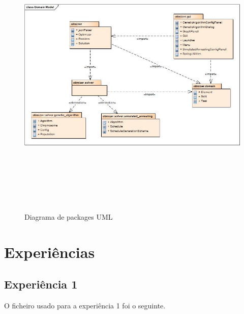 \begin{titlepage}
\begin{figure}[H]
  \centering
    \includegraphics[width=18cm, height = 14cm]{packageDiagram.jpg}
  \caption{Diagrama de packages UML}
  \label{packageD}
\end{figure}

\section{Experiências}

\subsection{Experiência 1}

O ficheiro usado para a experiência 1 foi o seguinte.  


\end{titlepage}
